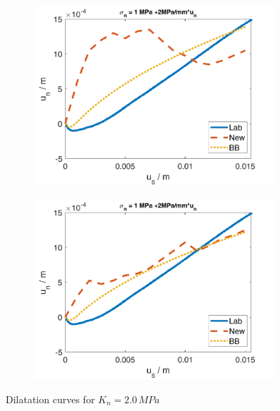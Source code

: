 \begin{figure}
\begin{subfigure}[c]{0.48\textwidth}
\includegraphics[width=0.99\textwidth]{./figures/MEX3-2_2DilationOrig.png}
\end{subfigure}
\begin{subfigure}[c]{0.48\textwidth}
\includegraphics[width=0.99\textwidth]{./figures/MEX3-2_2DilationWithout.png}
\end{subfigure}
\caption{Dilatation curves for $K_n=2.0\,\unit{MPa}$}
\label{fig:MEX3-2_2Dilation}
\end{figure}

